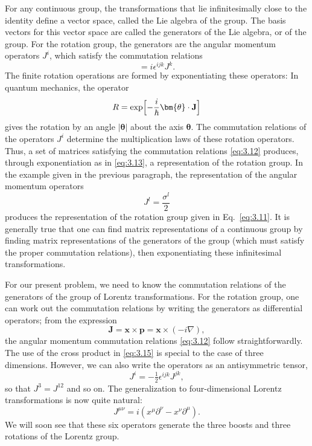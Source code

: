 For any continuous group, the transformations that lie infinitesimally close
to the identity define a vector space, called the Lie algebra of the group.
The basis vectors for this vector space are called the generators of the Lie
algebra, or of the group.  For the rotation group, the generators are the
angular momentum operators $J^i$, which satisfy the commutation relations
\begin{equation}
  [J^i, J^j] = i\epsilon^{ijk}J^k .
  \label{eq:3.12}
\end{equation}
The finite rotation operations are formed by exponentiating these operators:
In quantum mechanics, the operator
\begin{equation}
  R = \exp\Bigl[-\frac{i}{\hbar}\bm{\theta}\cdot\mathbf{J}\Bigr]
  \label{eq:3.13}
\end{equation}
gives the rotation by an angle $|\bm{\theta}|$ about the axis
$\bm{\theta}$.  The commutation relations of the operators $J^i$ determine
the multiplication laws of these rotation operators.  Thus, a set of matrices
satisfying the commutation relations \eqref{eq:3.12} produces, through
exponentiation as in \eqref{eq:3.13}, a representation of the rotation group.
In the example given in the previous paragraph, the representation of the
angular momentum operators
\begin{equation}
  J^l = \frac{\sigma^l}{2}
  \label{eq:3.14}
\end{equation}
produces the representation of the rotation group given in Eq.~\eqref{eq:3.11}.
It is generally true that one can find matrix representations of a continuous
group by finding matrix representations of the generators of the group (which
must satisfy the proper commutation relations), then exponentiating these
infinitesimal transformations.

For our present problem, we need to know the commutation relations of the
generators of the group of Lorentz transformations.  For the rotation group,
one can work out the commutation relations by writing the generators as
differential operators; from the expression
\begin{equation}
  \mathbf{J} = \mathbf{x}\times\mathbf{p} = \mathbf{x}\times(-i\nabla),
  \label{eq:3.15}
\end{equation}
the angular momentum commutation relations \eqref{eq:3.12} follow
straightforwardly.  The use of the cross product in \eqref{eq:3.15} is
special to the case of three dimensions.  However, we can also write the
operators as an antisymmetric tensor,
\begin{equation}
  J^i = -\tfrac{1}{2}\epsilon^{ijk}J^{jk},
\end{equation}
so that $J^3 = J^{12}$ and so on.  The generalization to four-dimensional
Lorentz transformations is now quite natural:
\begin{equation}
  J^{\mu\nu} = i(x^\mu\partial^\nu - x^\nu\partial^\mu).
  \label{eq:3.16}
\end{equation}
We will soon see that these six operators generate the three boosts and
three rotations of the Lorentz group.


